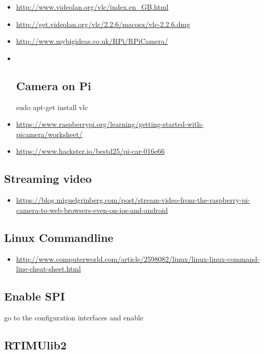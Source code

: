 \begin{itemize}
\item
  \url{http://www.videolan.org/vlc/index.en_GB.html}
\item
  \url{http://get.videolan.org/vlc/2.2.6/macosx/vlc-2.2.6.dmg}
\item
  \url{http://www.mybigideas.co.uk/RPi/RPiCamera/}
\item ~
  \subsection{Camera on Pi}\label{camera-on-pi}

  sudo apt-get install vlc
\item
  \url{https://www.raspberrypi.org/learning/getting-started-with-picamera/worksheet/}
\item
  \url{https://www.hackster.io/bestd25/pi-car-016e66}
\end{itemize}

\subsection{Streaming video}\label{streaming-video}

\begin{itemize}
\tightlist
\item
  \url{https://blog.miguelgrinberg.com/post/stream-video-from-the-raspberry-pi-camera-to-web-browsers-even-on-ios-and-android}
\end{itemize}

\subsection{Linux Commandline}\label{linux-commandline}

\begin{itemize}
\tightlist
\item
  \url{http://www.computerworld.com/article/2598082/linux/linux-linux-command-line-cheat-sheet.html}
\end{itemize}

\subsection{Enable SPI}\label{enable-spi}

go to the configuration interfaces and enable

\subsection{RTIMUlib2}\label{rtimulib2}

